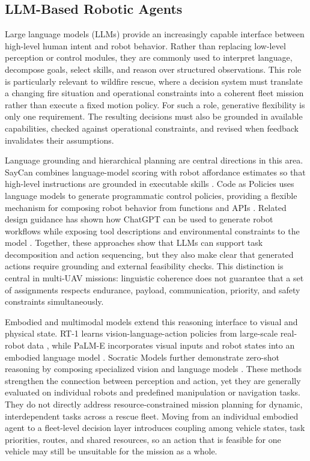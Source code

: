 \subsection{LLM-Based Robotic Agents}

Large language models (LLMs) provide an increasingly capable interface between
high-level human intent and robot behavior. Rather than replacing low-level
perception or control modules, they are commonly used to interpret language,
decompose goals, select skills, and reason over structured observations. This
role is particularly relevant to wildfire rescue, where a decision system
must translate a changing fire situation and operational constraints into a
coherent fleet mission rather than execute a fixed motion policy. For such a
role, generative flexibility is only one requirement. The resulting decisions
must also be grounded in available capabilities, checked against operational
constraints, and revised when feedback invalidates their assumptions.

Language grounding and hierarchical planning are central directions in this
area. SayCan combines language-model scoring with robot affordance estimates so
that high-level instructions are grounded in executable skills
\cite{ahn2022saycan}. Code as Policies uses language models to generate
programmatic control policies, providing a flexible mechanism for composing
robot behavior from functions and APIs \cite{liang2023codeaspolicies}.
Related design guidance has shown how ChatGPT can be used to generate robot
workflows while exposing tool descriptions and environmental constraints to the
model \cite{vemprala2023chatgptrobotics}. Together, these approaches show that
LLMs can support task decomposition and action sequencing, but they also make
clear that generated actions require grounding and external feasibility checks.
This distinction is central in multi-UAV missions: linguistic coherence does
not guarantee that a set of assignments respects endurance, payload,
communication, priority, and safety constraints simultaneously.

Embodied and multimodal models extend this reasoning interface to visual and
physical state. RT-1 learns vision-language-action policies from large-scale
real-robot data \cite{brohan2023rt1}, while PaLM-E incorporates visual inputs
and robot states into an embodied language model \cite{driess2023palme}.
Socratic Models further demonstrate zero-shot reasoning by composing
specialized vision and language models \cite{zeng2023socratic}. These methods
strengthen the connection between perception and action, yet they are generally
evaluated on individual robots and predefined manipulation or navigation tasks.
They do not directly address resource-constrained mission planning for dynamic,
interdependent tasks across a rescue fleet. Moving from an individual embodied
agent to a fleet-level decision layer introduces coupling among vehicle states,
task priorities, routes, and shared resources, so an action that is feasible for
one vehicle may still be unsuitable for the mission as a whole.

